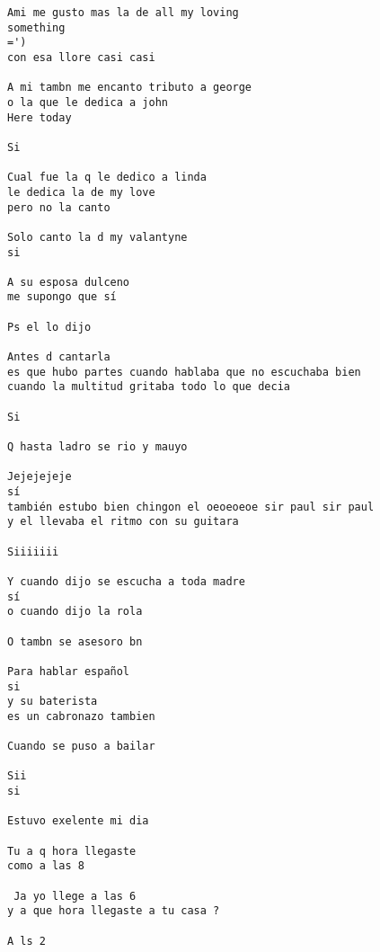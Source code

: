 \begin{verbatim}
Ami me gusto mas la de all my loving
something
=')
con esa llore casi casi

A mi tambn me encanto tributo a george
o la que le dedica a john
Here today

Si

Cual fue la q le dedico a linda
le dedica la de my love
pero no la canto

Solo canto la d my valantyne
si

A su esposa dulceno
me supongo que sí

Ps el lo dijo

Antes d cantarla
es que hubo partes cuando hablaba que no escuchaba bien
cuando la multitud gritaba todo lo que decia

Si

Q hasta ladro se rio y mauyo

Jejejejeje
sí
también estubo bien chingon el oeoeoeoe sir paul sir paul
y el llevaba el ritmo con su guitara

Siiiiiii

Y cuando dijo se escucha a toda madre
sí
o cuando dijo la rola

O tambn se asesoro bn

Para hablar español
si
y su baterista
es un cabronazo tambien

Cuando se puso a bailar

Sii
si

Estuvo exelente mi dia

Tu a q hora llegaste
como a las 8

 Ja yo llege a las 6
y a que hora llegaste a tu casa ?

A ls 2
\end{verbatim}
